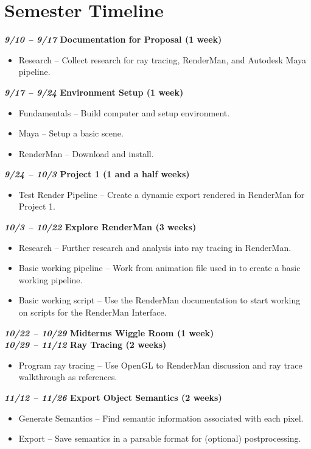 \documentclass[conference]{IEEEtran}
\begin{document}
\section{Semester Timeline}
\label{subsec:semester_timeline}
\textbf{\textit{9/10 -- 9/17} Documentation for Proposal (1 week)}
\begin{itemize}
\item Research -- Collect research for ray tracing, RenderMan, and Autodesk Maya pipeline.
\end{itemize}
\textbf{\textit{9/17 -- 9/24} Environment Setup (1 week)}
\begin{itemize}
\item Fundamentals -- Build computer and setup environment.
\item Maya -- Setup a basic scene.
\item RenderMan -- Download and install.
\end{itemize}
\textbf{\textit{9/24 -- 10/3} Project 1 (1 and a half weeks)}
\begin{itemize}
\item Test Render Pipeline -- Create a dynamic export rendered in RenderMan for Project 1.
\end{itemize}
\textbf{\textit{10/3 -- 10/22} Explore RenderMan (3 weeks)}
\begin{itemize}
\item Research -- Further research and analysis into ray tracing in RenderMan.
\item Basic working pipeline -- Work from animation file used in \cite{thesis_harris}
to create a basic working pipeline.
\item Basic working script -- Use the RenderMan documentation \cite{renderman_docs}
to start working on scripts for the RenderMan Interface.
\end{itemize}
\textbf{\textit{10/22 -- 10/29} Midterms Wiggle Room (1 week)}\\
\textbf{\textit{10/29 -- 11/12} Ray Tracing (2 weeks)}
\begin{itemize}
\item Program ray tracing -- Use OpenGL to RenderMan discussion \cite{renderman_opengl}
and ray trace walkthrough \cite{raytrace_walkthrough} as references.
\end{itemize}
\textbf{\textit{11/12 -- 11/26} Export Object Semantics (2 weeks)}
\begin{itemize}
\item Generate Semantics -- Find semantic information associated with each pixel.
\item Export -- Save semantics in a parsable format for (optional) postprocessing.
\end{itemize}
\end{document}
